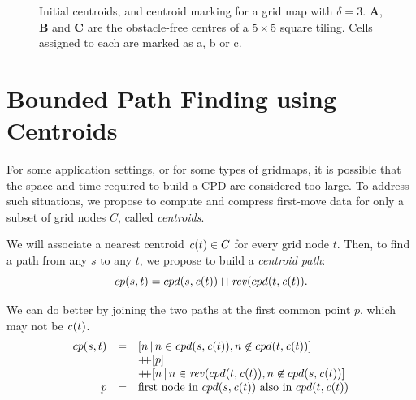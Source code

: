 \begin{figure}
\begin{tikzpicture}[scale=0.75]
    \end{tikzpicture}
    \caption{Initial centroids, and centroid marking for a grid map with $\delta = 3$.
    \textbf{A}, \textbf{B} and \textbf{C} are the obstacle-free centres of a $5 \times 5$ 
    square tiling. Cells assigned to each are marked as a, b or c.}
    \label{fig:ci}
\end{figure}


\section{Bounded Path Finding using Centroids}
\label{sec:bounded}

For some application settings, or for some types of gridmaps, it is possible 
that the space and time required to build a CPD are considered too large. 
To address such situations, we propose to compute and compress first-move 
data for only a subset of grid nodes $C$, called \emph{centroids}.

We will associate a nearest centroid $\centroid(t) \in C$ for every grid node $t$.
Then, to find a path from any $s$ to any $t$, we propose to build a
\emph{centroid path}:
$$
cp(s,t) = cpd(s,\centroid(t)) \pp \reverse(cpd(t,\centroid(t)).
$$

We can do better by joining the two paths at the first common point $p$,
which may not be $\centroid(t)$. 
$$
\begin{array}{rcl}
cp(s,t) & =  & [ n \,|\, n \in cpd(s,\centroid(t)), n \not\in cpd(t,\centroid(t))] \\
&&  \pp [ p ] \\
&& \pp [ n \,|\, n \in \reverse(cpd(t,\centroid(t)), n \not\in cpd(s,\centroid(t))] \\
p & = & \mbox{first node in $cpd(s,\centroid(t))$ also in $cpd(t,\centroid(t))$} 
\end{array}
$$

